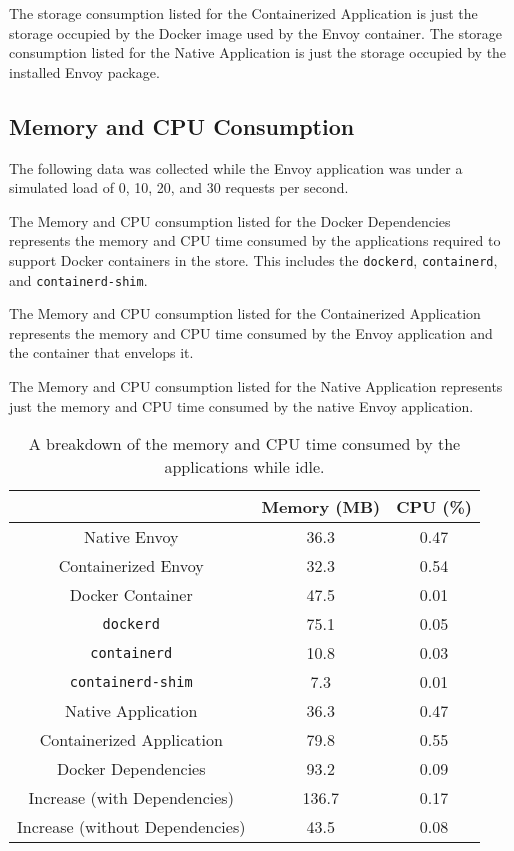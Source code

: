 \documentclass{article}
\begin{document}
The storage consumption listed for the Containerized Application is just the storage occupied by the Docker image used by the Envoy container. The storage consumption listed for the Native Application is just the storage occupied by the installed Envoy package.

\subsection{Memory and CPU Consumption}
The following data was collected while the Envoy application was under a simulated load of 0, 10, 20, and 30 requests per second.

The Memory and CPU consumption listed for the Docker Dependencies represents the memory and CPU time consumed by the applications required to support Docker containers in the store. This includes the \texttt{dockerd}, \texttt{containerd}, and \texttt{containerd-shim}.

The Memory and CPU consumption listed for the Containerized Application represents the memory and CPU time consumed by the Envoy application and the container that envelops it.

The Memory and CPU consumption listed for the Native Application represents just the memory and CPU time consumed by the native Envoy application.

\begin{table}[H]
\begin{tabular}{ |c|c|c| }
 \hline
   & Memory (MB) & CPU (\%) \\ 
 \hline
 Native Envoy & 36.3 & 0.47 \\
 \hline
 Containerized Envoy & 32.3 & 0.54 \\
 \hline
 Docker Container & 47.5 & 0.01 \\
 \hline
 \texttt{dockerd} & 75.1 & 0.05 \\
 \hline
 \texttt{containerd} & 10.8 & 0.03 \\
 \hline
 \texttt{containerd-shim} & 7.3 & 0.01 \\
 \hline\hline
 Native Application & 36.3 & 0.47 \\
 \hline
 Containerized Application & 79.8 & 0.55 \\
 \hline
 Docker Dependencies & 93.2 & 0.09 \\
 \hline\hline
 Increase (with Dependencies) & 136.7 & 0.17 \\
 \hline
 Increase (without Dependencies) & 43.5 & 0.08 \\
 \hline
\end{tabular}
\caption{A breakdown of the memory and CPU time consumed by the applications while idle.}
\label{idle-consumption-breakdown}
\end{table}
\end{document}
